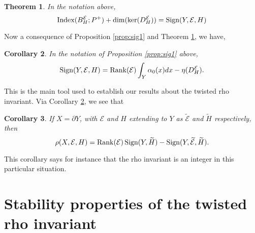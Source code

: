 \documentclass[12pt]{amsart}
\theoremstyle{plain}
\newtheorem{theorem}{Theorem}[section]
\newtheorem{corollary}[theorem]{Corollary}
\theoremstyle{definition}
\theoremstyle{remark}
\begin{document}
\begin{theorem}\label{thm:sig}
In the notation above, 
$$
{\operatorname{Index}}(B^{\mathcal E}_H; P^+) + \dim(\ker(D^{\mathcal E}_H))= 
{\rm Sign}(Y, {\mathcal E}, H)
$$
\end{theorem}

Now 
a  consequence of Proposition \ref{prop:sig1} and Theorem \ref{thm:sig}, we
have,

\begin{corollary}\label{cor:sig}
In the notation of Proposition \ref{prop:sig1} above, 
\begin{equation}\label{sign-thm}
{\rm Sign}(Y, {\mathcal E}, H)= {{{\operatorname{Rank}} ({\mathcal E})}} \int_Y \alpha_0(x)dx - \eta(D^{\mathcal E}_H).
\end{equation}
\end{corollary}

This is the main tool used to establish our results about the twisted rho invariant. 
Via Corollary \ref{cor:sig}, we see that 

\begin{corollary}\label{cor:rho}
If $X = \partial Y$, with ${\mathcal E}$ and $H$ extending to $Y$ as $\widetilde{\mathcal E}$ and $\widetilde H$ respectively, 
then $$\rho(X,{\mathcal E},H) = {\operatorname{Rank}}({\mathcal E})\,
{\rm Sign}(Y, \widetilde H) - {\rm Sign}(Y, \widetilde{\mathcal E}, \widetilde H).$$
\end{corollary}

This corollary says for instance that the rho invariant is an integer in this particular situation.

\section{Stability properties of the twisted rho invariant}
\label{sect:var}
\end{document}
